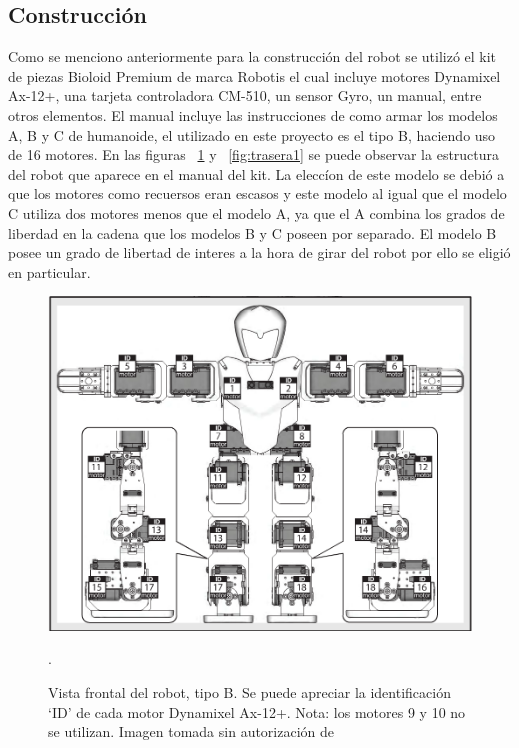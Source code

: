 \label{subsection:construccion}
\subsection{Construcción}
Como se menciono anteriormente para la construcción del robot se utilizó el kit de piezas Bioloid Premium de marca Robotis el cual incluye motores Dynamixel Ax-12+, una tarjeta controladora CM-510, un sensor Gyro, un manual, entre otros elementos. El manual incluye las instrucciones de como armar los modelos A, B y C de humanoide, el utilizado en este proyecto es el tipo B, haciendo uso de 16 motores. En las figuras ~\ref{fig:frontal} y ~\ref{fig:trasera1} se puede observar la estructura del robot que aparece en el manual del kit. La elecc\'ion de este modelo se debi\'o a que los motores como recuersos eran escasos y este modelo al igual que el modelo C utiliza dos motores menos que el modelo A, ya que el A combina los grados de liberdad en la cadena que los modelos B y C poseen por separado. El modelo B posee un grado de libertad de interes a la hora de girar del robot por ello se eligi\'o en particular.

\begin{figure}[hbtp]
\centering
\includegraphics[scale=0.3]{imagenes/Robot.png}
\caption{Vista frontal del robot, tipo B. Se puede apreciar la identificación ‘ID’ de cada motor Dynamixel Ax-12+. Nota: los motores 9 y 10 no se utilizan. Imagen tomada sin autorizaci\'on de \cite{manualRobot}}.

\label{fig:frontal}
\end{figure}

